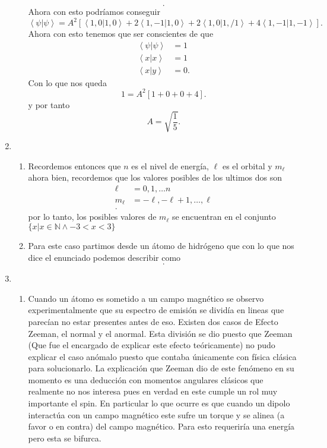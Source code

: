 \documentclass[12pt]{exam}
\begin{document}
\begin{enumerate}
\begin{enumerate}
\[.\] Ahora con esto podríamos conseguir \[
\left< \psi | \psi \right> = A^2 \left[ \left< 1,0 | 1,0 \right> + 2\left< 1, -1 | 1, 0 \right> + 2 \left< 1,0 | 1,/1 \right>  + 4\left< 1, -1 | 1, -1 \right>  \right] 
.\] Ahora con esto tenemos que ser conscientes de que
\begin{align*}
  \left< \psi | \psi \right> &= 1 \\
  \left< x | x \right> &= 1 \\
  \left< x | y \right> &=  0 
.\end{align*}
Con lo que nos queda \[
  1 = A^2\left[ 1 + 0 + 0 + 4 \right] 
.\] y por tanto \[
A = \sqrt{\frac{1}{5}}
.\] 
    \end{enumerate}
  \item 
    \begin{enumerate}
      \item Recordemos entonces que $n$ es el nivel de energía, $\ell$ es el orbital y $m_\ell$ ahora bien, recordemos que los valores posibles de los ultimos dos son
	\begin{align*}
	  \ell &= 0, 1, \ldots n \\
	  m_\ell &= -\ell,-\ell+1,\ldots,\ell \\
	.\end{align*}
	por lo tanto, los posibles valores de $m_\ell$ se encuentran en el conjunto  $\{x | x\in\mathbb{N}\land -3<x<3\}$ 
      \item Para este caso partimos desde un átomo de hidrógeno que con lo que nos dice el enunciado podemos describir como \[    
      .\] 
    \end{enumerate}
  \item 
    \begin{enumerate}
      \item Cuando un átomo es sometido a un campo magnético se observo experimentalmente que su espectro de emisión se dividía en lineas que parecían no estar presentes antes de eso. Existen dos casos de Efecto Zeeman, el normal y el anormal. Esta división se dio puesto que Zeeman (Que fue el encargado de explicar este efecto teóricamente) no pudo explicar el caso anómalo puesto que contaba únicamente con física clásica para solucionarlo. 
	La explicación que Zeeman dio de este fenómeno en su momento es una deducción con momentos angulares clásicos que realmente no nos interesa pues en verdad en este cumple un rol muy importante el spin. En particular lo que ocurre es que cuando un dipolo interactúa con un campo magnético este sufre un torque y se alinea (a favor o en contra) del campo magnético. Para esto requeriría una energía pero esta se bifurca.

\end{enumerate}
\end{enumerate}
\end{document}
